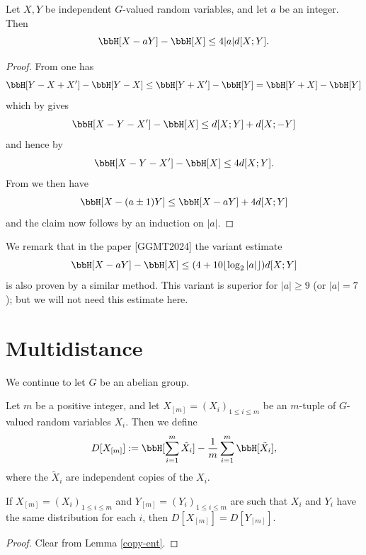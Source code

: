 \begin{lemma}\label{sum-dilate-II}\leanok  Let $X,Y$ be independent $G$-valued random variables, and let $a$ be an integer.  Then
  $$\bbH[X-aY] - \bbH[X] \leq 4 |a| d[X;Y].$$
\end{lemma}

\begin{proof}\leanok From  one has
  $$\bbH[Y-X+X'] - \bbH[Y-X] \leq \bbH[Y+X'] - \bbH[Y] = \bbH[Y+X] - \bbH[Y]$$
  which by  gives
  $$\bbH[X-Y-X'] -\bbH[X] \leq d[X;Y] + d[X;-Y]$$
  and hence by 
  $$\bbH[X-Y-X'] - \bbH[X] \leq 4d[X;Y].$$
  From  we then have
  $$\bbH[X-(a\pm 1)Y] \leq \bbH[X-aY] + 4 d[X;Y]$$
and the claim now follows by an induction on $|a|$.
\end{proof}

We remark that in the paper [GGMT2024] the variant estimate
$$\bbH[X-aY] - \bbH[X] \leq (4 + 10 \lfloor \log_2 |a| \rfloor) d[X;Y]$$
is also proven by a similar method.  This variant is superior for $|a| \geq 9$ (or $|a|=7$); but we will not need this estimate here.



\section{Multidistance}

We continue to let $G$ be an abelian group.

\begin{definition}[Multidistance]\label{multidist-def}\leanok  Let $m$ be a positive integer, and let $X_{[m]} = (X_i)_{1 \leq i \leq m}$ be an $m$-tuple of $G$-valued random variables $X_i$. Then we define
\[
  D[X_{[m]}] := \bbH[\sum_{i=1}^m \tilde X_i] - \frac{1}{m} \sum_{i=1}^m \bbH[\tilde X_i],
\]
where the $\tilde X_i$ are independent copies of the $X_i$.
\end{definition}

\begin{lemma}\label{multidist-copy}\leanok  If $X_{[m]} = (X_i)_{1 \leq i \leq m}$ and $Y_{[m]} = (Y_i)_{1 \leq i \leq m}$ are such that $X_i$ and $Y_i$ have the same distribution for each $i$, then $D[X_{[m]}] = D[Y_{[m]}]$.
\end{lemma}

\begin{proof}\leanok Clear from Lemma \ref{copy-ent}.
\end{proof}

